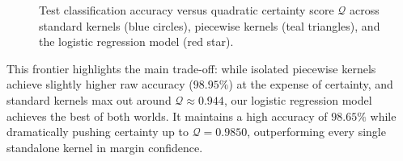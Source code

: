 \begin{figure}[H]
    \caption{Test classification accuracy versus quadratic certainty score $\mathcal Q$ across standard kernels (blue circles), piecewise kernels (teal triangles), and the logistic regression model (red star).}
    \label{fig:model_frontier}
\end{figure}

This frontier highlights the main trade-off: while isolated piecewise kernels achieve slightly higher raw accuracy ($98.95\%$) at the expense of certainty, and standard kernels max out around $\mathcal Q \approx 0.944$, our logistic regression model achieves the best of both worlds. It maintains a high accuracy of $98.65\%$ while dramatically pushing certainty up to $\mathcal Q = 0.9850$, outperforming every single standalone kernel in margin confidence.


